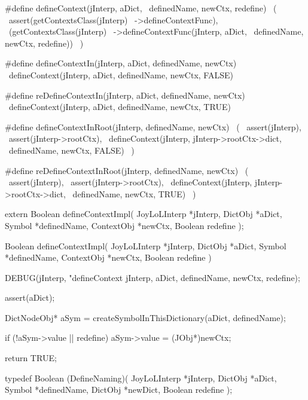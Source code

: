#define defineContext(jInterp, aDict,     \
  definedName, newCtx, redefine)          \
  (                                       \
    assert(getContextsClass(jInterp)      \
      ->defineContextFunc),               \
    (getContextsClass(jInterp)            \
      ->defineContextFunc(jInterp, aDict, \
        definedName, newCtx, redefine))   \
  )

#define defineContextIn(jInterp, aDict, definedName, newCtx)  \
  defineContext(jInterp, aDict, definedName, newCtx, FALSE)

#define reDefineContextIn(jInterp, aDict, definedName, newCtx)  \
  defineContext(jInterp, aDict, definedName, newCtx, TRUE)

#define defineContextInRoot(jInterp, definedName, newCtx) \
  (                                                       \
    assert(jInterp),                                      \
    assert(jInterp->rootCtx),                             \
    defineContext(jInterp, jInterp->rootCtx->dict,        \
      definedName, newCtx, FALSE)                         \
  )

#define reDefineContextInRoot(jInterp, definedName, newCtx) \
  (                                                         \
    assert(jInterp),                                        \
    assert(jInterp->rootCtx),                               \
    defineContext(jInterp, jInterp->rootCtx->dict,          \
      definedName, newCtx, TRUE)                            \
  )
\stopCHeader

\setCHeaderStream{private}
\startCHeader
extern Boolean defineContextImpl(
  JoyLoLInterp *jInterp,
  DictObj      *aDict,
  Symbol       *definedName,
  ContextObj   *newCtx,
  Boolean       redefine
);
\stopCHeader
\setCHeaderStream{public}

\startCCode
Boolean defineContextImpl(
  JoyLoLInterp *jInterp,
  DictObj      *aDict,
  Symbol       *definedName,
  ContextObj   *newCtx,
  Boolean       redefine
) {
  DEBUG(jInterp, "defineContext %
        jInterp, aDict, definedName, newCtx, redefine);

  assert(aDict);
  
  DictNodeObj* aSym =
    createSymbolInThisDictionary(aDict, definedName);

  if (!aSym->value || redefine) {
    aSym->value   = (JObj*)newCtx;
  }

  return TRUE;
}
\stopCCode

\startCHeader
typedef Boolean (DefineNaming)(
  JoyLoLInterp *jInterp,
  DictObj      *aDict,
  Symbol       *definedName,
  DictObj      *newDict,
  Boolean       redefine
);


